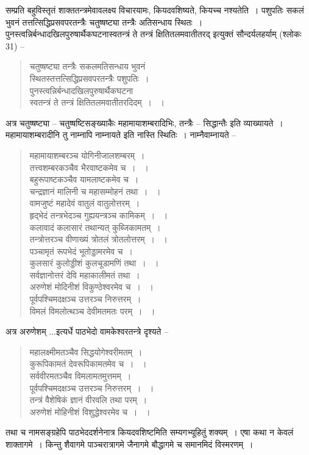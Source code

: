 {सम्प्रति बहुविस्तृतं शाक्ततन्त्रमेवावलक्ष्य विचारयामः, कियदवशिष्यते, कियच्च नश्यतेति~। पशुपतिः सकलं भुवनं तत्तत्सिद्धिप्रसवपरतन्त्रैः चतुष्षष्ट्या तन्त्रैः अतिसन्धाय स्थितः~। पुनस्त्वन्निर्बन्धादखिलपुरुषार्थैकघटनास्वतन्त्रं ते तन्त्रं क्षितितलमवातीतरद् इत्युक्तं सौन्दर्यलहर्याम् (श्लोकः 31) –
\begin{verse}
चतुष्षष्ट्या तन्त्रैः सकलमतिसन्धाय भुवनं \\
स्थितस्तत्तत्सिद्धिप्रसवपरतन्त्रैः पशुपतिः~। \\
पुनस्त्वन्निर्बन्धादखिलपुरुषार्थैकघटना \\
स्वतन्त्रं ते तन्त्रं क्षितितलमवातीतरदिदम्~। ~। 
\end{verse}
अत्र चतुष्षष्ट्या – चतुष्षष्टिसङ्ख्याकैः महामायाशम्बरादिभिः, तन्त्रैः – सिद्धान्तैः इति व्याख्यायते~। महामायाशम्बरादीनि तु नाम्नापि नाम्नायते इति नास्ति स्थितिः~। नाम्नैवाम्नायते –
\begin{verse}
महामायाशम्बरञ्च योगिनीजालशम्बरम्~। \\
तत्त्वशम्बरकञ्चैव भैरवाष्टकमेव च~। ~। \\
बहुरूपाष्टकञ्चैव यामलाष्टकमेव च~। \\
चन्द्रज्ञानं मालिनी च महासम्मोहनं तथा~। ~। \\
वामजुष्टं महादेवं वातुलं वातुलोत्तरम्~। \\
हृद्भेदं तन्त्रभेदञ्च गुह्ययन्त्रञ्च कामिकम्~। ~। \\
कलावादं कलासारं तथान्यत् कुब्जिकामतम्~। \\
तन्त्रोत्तरञ्च वीणाख्यं त्रोतलं त्रोतलोत्तरम्~। ~। \\
पञ्चामृतं रूपभेदं भूतोड्डामरमेव च~। \\
कुलसारं कुलोड्डीशं कुलचूडामणिं तथा~। ~। \\
सर्वज्ञानोत्तरं देवि महाकालीमतं तथा~। \\
अरुणेशं मोदिनीशं विकुण्ठेश्वरमेव च~। ~। \\
पूर्वपश्चिमदक्षञ्च उत्तरञ्च निरुत्तरम्~। \\
विमलं विमलोत्थञ्च देवीमतमतः परम्~। ~। 
\end{verse}
अत्र अरुणेशम् ...इत्यर्धे पाठभेदो वामकेश्वरतन्त्रे दृश्यते –
\begin{verse}
महालक्ष्मीमतञ्चैव सिद्धयोगेश्वरीमतम्~। \\
कुरूपिकामतं देवरूपिकामतमेव च~। ~। \\
सर्ववीरमतञ्चैव विमलामतमुत्तमम्~। \\
पूर्वपश्चिमदक्षञ्च उत्तरञ्च निरुत्तरम्~। ~। \\
तन्त्रं वैशेषिकं ज्ञानं वीरवलि तथा परम्~। \\ 
अरुणेशं मोहिनीशं विशुद्धेश्वरमेव च~। ~। 
\end{verse}
तथा च नामसङ्ग्रहेपि पाठभेददर्शनेनात्र कियदवशिष्टमिति सम्यगभ्यूहितुं शक्यम्~। एषा कथा न केवलं शाक्तागमे~। किन्तु शैवागमे पाञ्चरात्रागमे जैनागमे बौद्धागमे च समानमिदं विस्मरणम्~। 

}
